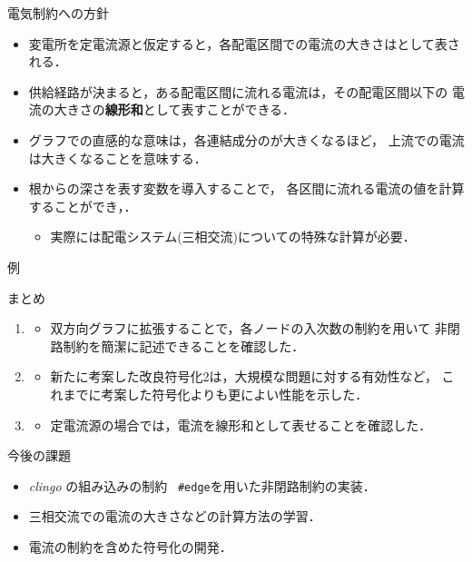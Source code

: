 \documentclass[dvipdfmx,11pt]{beamer}
\begin{document}
\begin{frame}{電気制約への方針}
 \begin{itemize}
  \item 変電所を定電流源と仮定すると，各配電区間での電流の大きさはとして表される．
  \item 供給経路が決まると，ある配電区間に流れる電流は，その配電区間以下の
		電流の大きさの\alert{\bf 線形和}として表すことができる．
  \item グラフでの直感的な意味は，各連結成分のが大きくなるほど，
		上流での電流は大きくなることを意味する．
  \item 根からの深さを表す変数を導入することで，
		各区間に流れる電流の値を計算することができ，．
		\begin{itemize}
		 \item 実際には配電システム(三相交流)についての特殊な計算が必要．
		\end{itemize}
 \end{itemize}\vfill
 \begin{exampleblock}{例}
  \centering
  
 \end{exampleblock} \vfill
\end{frame}
\begin{frame}{まとめ}
 \begin{enumerate}
  \item {}
		\begin{itemize}
		 \item 双方向グラフに拡張することで，各ノードの入次数の制約を用いて
			   非閉路制約を簡潔に記述できることを確認した．
		\end{itemize}
  \item {}
		\begin{itemize}
		 \item 新たに考案した改良符号化2は，大規模な問題に対する有効性など，
			   これまでに考案した符号化よりも更によい性能を示した．
		\end{itemize}
  \item {}
		\begin{itemize}
		 \item 定電流源の場合では，電流を線形和として表せることを確認した．
		\end{itemize}
 \end{enumerate} \vfill
 \begin{alertblock}{今後の課題}
  \begin{itemize}
   \item \textit{clingo} の組み込みの制約 ~\texttt{\#edge}を用いた非閉路制約の実装．
   \item 三相交流での電流の大きさなどの計算方法の学習．
   \item 電流の制約を含めた符号化の開発．
  \end{itemize}
 \end{alertblock} \vfill
\end{frame}



\end{document}

